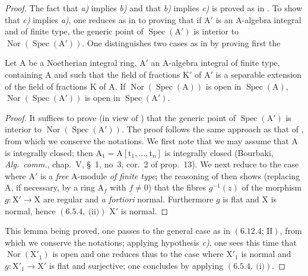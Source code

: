 \begin{proof}
The fact that \emph{a)} implies \emph{b)} and that \emph{b)} implies \emph{c)} is proved as in . To show that \emph{c)}
implies \emph{a)}, one reduces as in  to proving that if $\mathrm{A}'$ is an $\mathrm{A}$-algebra
integral and of finite type, the generic point of $\operatorname{Spec}(\mathrm{A}')$ is interior to $\operatorname{Nor}(\operatorname{Spec}(\mathrm{A}'))$. One distinguishes two cases
as in  by proving first the

\begin{lemma}[6.13.7.1]
\label{IV.6.13.7.1}
Let $\mathrm{A}$ be a Noetherian integral ring, $\mathrm{A}'$ an $\mathrm{A}$-algebra integral of finite type, containing $\mathrm{A}$ and such
that the field of fractions $\mathrm{K}'$ of $\mathrm{A}'$ is a separable extension of the field of fractions $\mathrm{K}$ of $\mathrm{A}$. If $\operatorname{Nor}(\operatorname{Spec}(\mathrm{A}))$ is open in
$\operatorname{Spec}(\mathrm{A})$, $\operatorname{Nor}(\operatorname{Spec}(\mathrm{A}'))$ is open in $\operatorname{Spec}(\mathrm{A}')$.
\end{lemma}

\begin{proof}
It suffices to prove (in view of ) that the generic point of $\operatorname{Spec}(\mathrm{A}')$ is interior to
$\operatorname{Nor}(\operatorname{Spec}(\mathrm{A}'))$. The proof follows the same approach as that of , from which we conserve the notations.
We first note that we may assume that $\mathrm{A}$ is integrally closed; then $\mathrm{A}_1=\mathrm{A}[\mathrm{t}_1,\ldots,\mathrm{t}_n]$
is integrally closed (Bourbaki, \emph{Alg.~comm.}, chap.~V, \S~1, no~3, cor.~2 of prop.~13). We next reduce to the
case where $\mathrm{A}'$ is a \emph{free} $\mathrm{A}$-module \emph{of finite type}; the reasoning of  then shows
(replacing $\mathrm{A}$, if necessary, by a ring $\mathrm{A}_f$ with $f\neq 0$) that the fibres $g^{-1}(z)$
of the morphism $g:\mathrm{X}'\to\mathrm{X}$ are regular and \emph{a fortiori} normal.
Furthermore $g$ is flat and $\mathrm{X}$ is normal, hence $(6.5.4,~\text{(ii)})$ $\mathrm{X}'$ is normal.
\end{proof}

This lemma being proved, one passes to the general case as in $(\text{6.12.4; II})$, from which we conserve the
notations; applying hypothesis \emph{c)}, one sees this time that $\operatorname{Nor}(\mathrm{X}'_1)$ is open and one reduces thus to the case
where $\mathrm{X}'_1$ is normal and $g:\mathrm{X}'_1\to\mathrm{X}'$ is flat and surjective; one concludes by applying $(6.5.4,~\text{(i)})$.
\end{proof}

